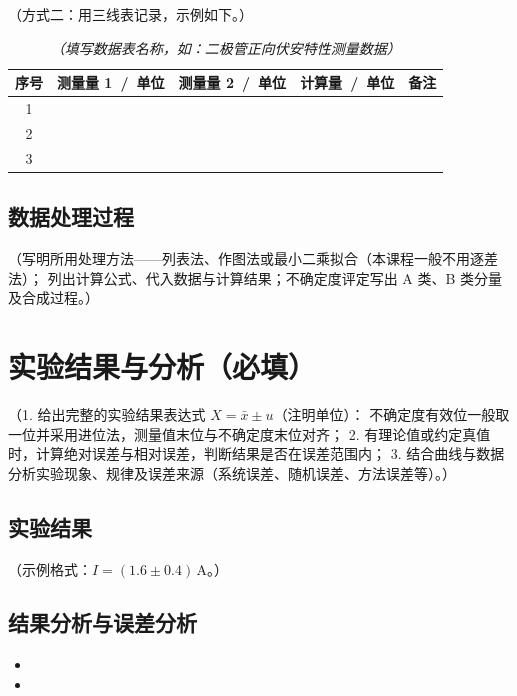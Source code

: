 \documentclass[UTF8,AutoFakeBold]{article}%
\begin{document}
（方式二：用三线表记录，示例如下。）

\begin{table}[H]
  \centering
  \caption{\textit{（填写数据表名称，如：二极管正向伏安特性测量数据）}}
  \label{tab:rawdata}
  \renewcommand{\arraystretch}{1.25}
  \begin{tabular}{c c c c c}
    \toprule
    序号 & 测量量 1\ /\ 单位 & 测量量 2\ /\ 单位 & 计算量\ /\ 单位 & 备注 \\
    \midrule
    1 &  &  &  &  \\
    2 &  &  &  &  \\
    3 &  &  &  &  \\
    \bottomrule
  \end{tabular}
\end{table}

\subsection{数据处理过程}
（写明所用处理方法——列表法、作图法或最小二乘拟合（本课程一般不用逐差法）；
列出计算公式、代入数据与计算结果；不确定度评定写出 A 类、B 类分量及合成过程。）


\section{实验结果与分析（必填）}
（1. 给出完整的实验结果表达式 $X = \bar{x} \pm u$（注明单位）：
不确定度有效位一般取一位并采用进位法，测量值末位与不确定度末位对齐；
2. 有理论值或约定真值时，计算绝对误差与相对误差，判断结果是否在误差范围内；
3. 结合曲线与数据分析实验现象、规律及误差来源（系统误差、随机误差、方法误差等）。）

\subsection{实验结果}
（示例格式：$I = (1.6 \pm 0.4)\,\mathrm{A}$。）

\subsection{结果分析与误差分析}
\begin{itemize}
  \item 
  \item 
\end{itemize}
\end{document}
